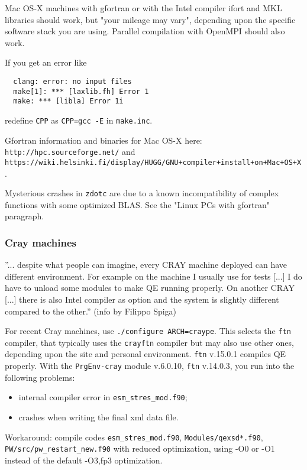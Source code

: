 \documentclass[12pt,a4paper]{article}
\begin{document}
Mac OS-X machines with gfortran or with the Intel compiler ifort
and MKL libraries should work, but "your mileage may vary", depending
upon the specific software stack you are using. Parallel compilation
with OpenMPI should also work.

If you get an error like
\begin{verbatim}
  clang: error: no input files
  make[1]: *** [laxlib.fh] Error 1
  make: *** [libla] Error 1i
\end{verbatim}
redefine \texttt{CPP} as \texttt{CPP=gcc -E} in \texttt{make.inc}.

Gfortran information and binaries for Mac OS-X here:
\texttt{http://hpc.sourceforge.net/} and
\texttt{https://wiki.helsinki.fi/display/HUGG/GNU+compiler+install+on+Mac+OS+X}.

Mysterious crashes in \texttt{zdotc} are due to a known incompatibility of
complex functions with some optimized BLAS. See the "Linux PCs with gfortran"
paragraph.

\subsubsection{Cray machines}

''... despite what people can imagine, every CRAY machine deployed can
have different environment. For example on the machine I usually use
for tests [...] I do have to unload some modules to make QE running
properly. On another CRAY [...] there is also Intel compiler as option
and the system is slightly different compared to the other.'' 
(info by Filippo Spiga)

For recent Cray machines, use \texttt{./configure ARCH=craype}.
This selects the \texttt{ftn} compiler, that typically uses
the \texttt{crayftn} compiler but may also use other ones,
depending upon the site and personal environment. \texttt{ftn} v.15.0.1
compiles QE properly. With the \verb|PrgEnv-cray| module v.6.0.10,
\texttt{ftn} v.14.0.3, you run into the following problems:
\begin{itemize}
\item internal compiler error in \verb|esm_stres_mod.f90|;
\item crashes when writing the final xml data file.
\end{itemize}
Workaround: compile codes \verb|esm_stres_mod.f90|,
\verb|Modules/qexsd*.f90|, \verb|PW/src/pw_restart_new.f90|
with reduced optimization, using -O0 or -O1 instead of the default
-O3,fp3 optimization.
\end{document}
